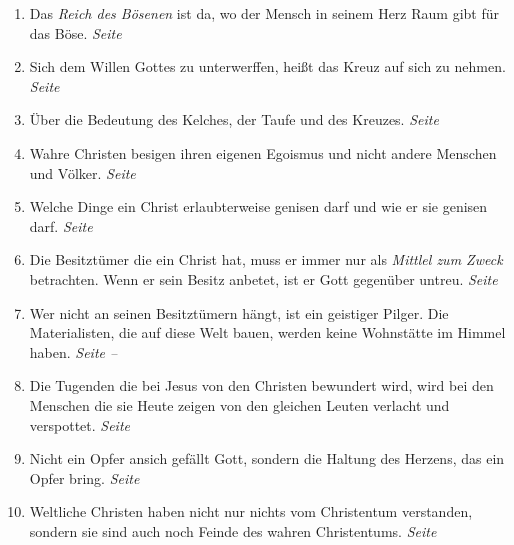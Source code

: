 \begin{enumerate}
 \item Das \textit{Reich des Bösenen} ist da, wo der Mensch in seinem Herz Raum
gibt für das Böse.
 \dotfill \textit{Seite \pageref{ref:03_04_reich_des_boesen}}\\
 
 \item Sich dem Willen Gottes zu unterwerffen, heißt das Kreuz auf sich zu
nehmen.
 \dotfill \textit{Seite
\pageref{ref:03_05_kreuz_auf_sich_nehmen}}\\

 \item Über die Bedeutung des Kelches, der Taufe und des Kreuzes.
 \dotfill \textit{Seite
\pageref{ref:04_04_kelch_taufe_kreuz}}\\

 \item Wahre Christen besigen ihren eigenen Egoismus und nicht andere Menschen
und Völker.
 \dotfill \textit{Seite \pageref{ref:04_05_besigen}}\\
 
 \item Welche Dinge ein Christ erlaubterweise genisen darf und wie er sie
genisen darf.
 \dotfill \textit{Seite \pageref{ref:04_07_vorteile}}\\
 
 \item Die Besitztümer die ein Christ hat, muss er immer nur als \textit{Mittlel
zum Zweck} betrachten. Wenn er sein Besitz anbetet, ist er Gott gegenüber
untreu.
 \dotfill \textit{Seite \pageref{ref:04_07_vorteile}}\\
 
 \item Wer nicht an seinen Besitztümern hängt, ist ein geistiger Pilger. Die
Materialisten, die auf diese Welt bauen, werden keine Wohnstätte im Himmel
haben.
 \dotfill \textit{Seite \pageref{ref:04_10_pilger} --
\pageref{ref:04_10_pilger_ende}}\\

 \item Die Tugenden die bei Jesus von den Christen bewundert wird, wird bei den
Menschen die sie Heute zeigen von den gleichen Leuten verlacht und verspottet.
 \dotfill \textit{Seite \pageref{ref:04_10_pilger}}\\
 \item Nicht ein Opfer ansich gefällt Gott, sondern die Haltung des Herzens, das
ein Opfer bring.
 \dotfill \textit{Seite \pageref{ref:04_13_opfer}}\\
 \item Weltliche Christen haben nicht nur nichts vom Christentum verstanden,
sondern sie sind auch noch Feinde des wahren Christentums.
 \dotfill \textit{Seite
\pageref{ref:04_13_weltliche_christen}}\\


\end{enumerate}
